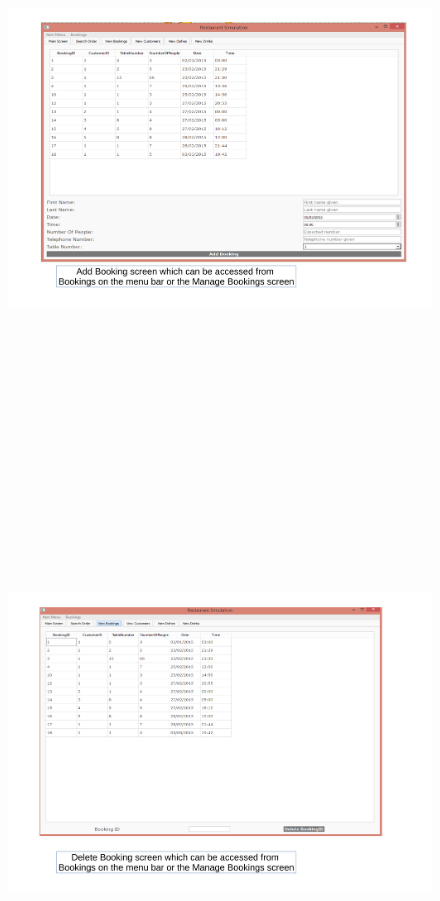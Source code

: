 \begin{landscape}
\begin{figure}[H]
    \includegraphics[height = 15cm]{./Maintenance/images/screen3}
    \caption{} \label{fig:screen3}
\end{figure}

\begin{figure}[H]
    \includegraphics[height = 15cm]{./Maintenance/images/screen4}
    \caption{} \label{fig:screen4}
\end{figure}


\end{landscape}
